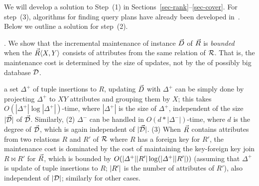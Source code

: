 


\vspace{0.36ex}
We will develop a solution to Step~(1)
in Sections~\ref{sec-rank}--\ref{sec-cover}.
For step~(3), algorithms for finding query plans
have already been developed in~\cite{VLDB19}.
Below we outline a solution for step~(2).

.
We show that
the incremental maintenance of \baav instance $\vec{D}$
of $\vec{R}$ is {\em bounded}~\cite{Reps96} when the \bs $\vec{R}\langle X,\allowbreak Y\rangle$
consists of attributes from the same relation of ${\mathcal R}$.
That is, the maintenance cost is determined by the
  size of updates, not by the  of possibly big database $\mathcal D$.

\vspace{0.36ex}
 a set $\Delta^{+}$ of tuple insertions to $R$, updating $\vec{D}$
with $\Delta^{+}$ %
can be simply done by projecting $\Delta^{+}$ %
to $XY$
attributes and grouping them by $X$; this takes
$O(|\Delta^{+}|\log|\Delta^{+}|)$-time, where $|\Delta^{+}|$ is
the size of $\Delta^{+}$, independent of the size $|\vec{\mathcal D}|$ of
$\vec{\mathcal D}$. Similarly, (2)  %
$\Delta^{-}$ can be
handled in $O(d*|\Delta^{-}|)$-time, where $d$ is the degree of
$\vec{\mathcal D}$, which is again independent of $|\vec{\mathcal D}|$.
(3) When $\vec{R}$ contains
attributes from \eg two relations $R$ and $R'$ of ${\mathcal R}$ where $R$
has a foreign key for $R'$, the
maintenance cost is dominated by the cost of
maintaining the key-foreign key join $R\Join R'$ for $\vec{R}$, 
which is bounded by
$O(|{\Delta^{+}}||{R'}|\log(|{\Delta^{+}}||{R'}|))$ (assuming
that $\Delta^{+}$ is update of tuple insertions
to $R$; $|{R'}|$ is the number of
attributes of $R'$), also 
independent of $|{\mathcal D}|$; similarly for other cases.

